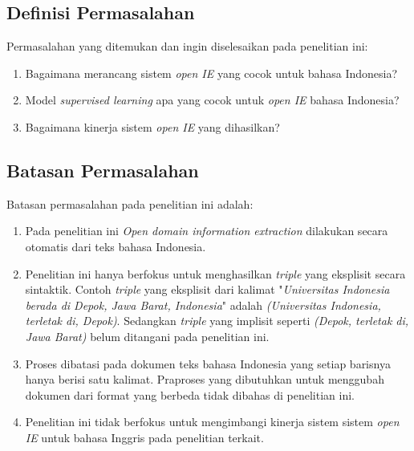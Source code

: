 \subsection{Definisi Permasalahan}

Permasalahan yang ditemukan dan ingin diselesaikan pada penelitian ini:

\begin{enumerate}
\item Bagaimana merancang sistem \textit{open IE} yang cocok untuk bahasa Indonesia?
\item Model \textit{supervised learning} apa yang cocok untuk \textit{open IE} bahasa Indonesia?
\item Bagaimana kinerja sistem \textit{open IE} yang dihasilkan?
\end{enumerate}

\subsection{Batasan Permasalahan}

Batasan permasalahan pada penelitian ini adalah:

\begin{enumerate}
	\item Pada penelitian ini \textit{Open domain information extraction} dilakukan secara otomatis dari teks bahasa Indonesia.
	
	\item Penelitian ini hanya berfokus untuk menghasilkan \textit{triple} yang eksplisit secara sintaktik. Contoh \textit{triple} yang eksplisit dari kalimat "\textit{Universitas Indonesia berada di Depok, Jawa Barat, Indonesia}" adalah \textit{(Universitas Indonesia, terletak di, Depok)}. Sedangkan \textit{triple} yang implisit seperti \textit{(Depok, terletak di, Jawa Barat)} belum ditangani pada penelitian ini.
	
	\item Proses dibatasi pada dokumen teks bahasa Indonesia yang setiap barisnya hanya berisi satu kalimat. Praproses yang dibutuhkan untuk menggubah dokumen dari format yang berbeda tidak dibahas di penelitian ini.
	
\item Penelitian ini tidak berfokus untuk mengimbangi kinerja sistem sistem \textit{open IE} untuk bahasa Inggris pada penelitian terkait.

\end{enumerate}

